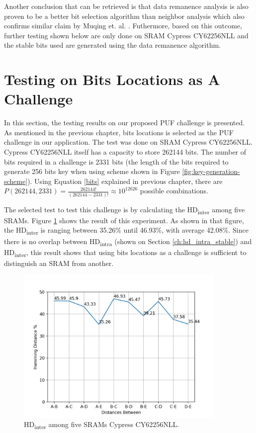 Another conclusion that can be retrieved is that data remanence analysis is also proven to be a better bit selection algorithm than neighbor analysis which also confirms similar claim by Muqing et. al. \cite{liu_zhou_tang_parhi_kim_2017}. Futhermore, based on this outcome, further testing shown below are only done on SRAM Cypress CY62256NLL and the stable bits used are generated using the data remanence algorithm.

\section{Testing on Bits Locations as A Challenge}
In this section, the testing results on our proposed PUF challenge is presented. As mentioned in the previous chapter, bits locations is selected as the PUF challenge in our application. The test was done on SRAM Cypress CY62256NLL. Cypress CY62256NLL itself has a capacity to store 262144 bits. The number of bits required in a challenge is 2331 bits (the length of the bits required to generate 256 bits key when using scheme shown in Figure \ref{fig:key-generation-scheme}). Using Equation \ref{bits} explained in previous chapter, there are $P(262144, 2331)=\frac{262144!}{\left( 262144-2331 \right) !}\approx 10^{12626}$ possible combinations.

The selected test to test this challenge is by calculating the HD\textsubscript{inter} among five SRAMs. Figure \ref{fig:cy62256cy62256nll_hd_inter_stable_remanences} shows the result of this experiment. As shown in that figure, the HD\textsubscript{inter} is ranging between 35.26\% until 46.93\%, with average 42.08\%. Since there is no overlap between HD\textsubscript{intra} (shown on Section \ref{ch:hd_intra_stable}) and HD\textsubscript{inter}, this result shows that using bits locations as a challenge is sufficient to distinguish an SRAM from another.

\begin{figure}[tph!]
    \centerline{\includegraphics[width={0.9\textwidth}]{images/cy62256nll_hd_inter_stable_remanences}}
    \caption{HD\textsubscript{inter} among five SRAMs Cypress CY62256NLL. }
    \label{fig:cy62256cy62256nll_hd_inter_stable_remanences}
\end{figure}

